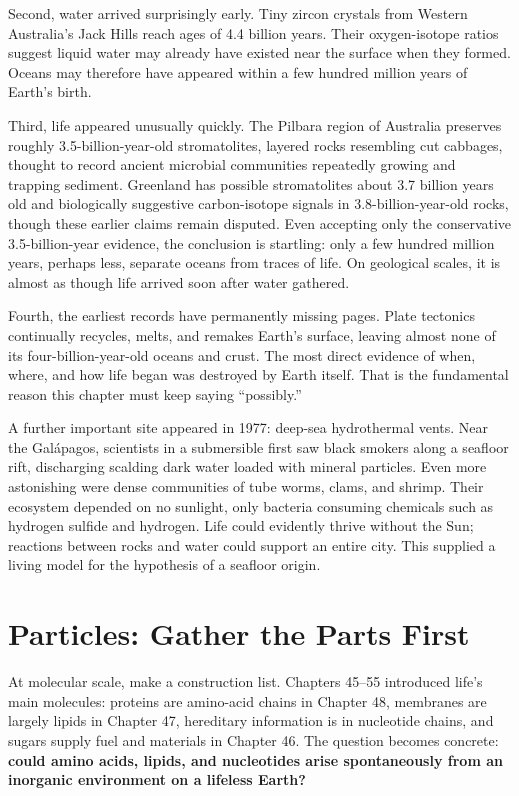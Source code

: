 Second, water arrived surprisingly early. Tiny zircon crystals from Western Australia's Jack Hills reach ages of 4.4 billion years. Their oxygen-isotope ratios suggest liquid water may already have existed near the surface when they formed. Oceans may therefore have appeared within a few hundred million years of Earth's birth.

Third, life appeared unusually quickly. The Pilbara region of Australia preserves roughly 3.5-billion-year-old stromatolites, layered rocks resembling cut cabbages, thought to record ancient microbial communities repeatedly growing and trapping sediment. Greenland has possible stromatolites about 3.7 billion years old and biologically suggestive carbon-isotope signals in 3.8-billion-year-old rocks, though these earlier claims remain disputed. Even accepting only the conservative 3.5-billion-year evidence, the conclusion is startling: only a few hundred million years, perhaps less, separate oceans from traces of life. On geological scales, it is almost as though life arrived soon after water gathered.

Fourth, the earliest records have permanently missing pages. Plate tectonics continually recycles, melts, and remakes Earth's surface, leaving almost none of its four-billion-year-old oceans and crust. The most direct evidence of when, where, and how life began was destroyed by Earth itself. That is the fundamental reason this chapter must keep saying ``possibly.''

A further important site appeared in 1977: deep-sea hydrothermal vents. Near the Galápagos, scientists in a submersible first saw black smokers along a seafloor rift, discharging scalding dark water loaded with mineral particles. Even more astonishing were dense communities of tube worms, clams, and shrimp. Their ecosystem depended on no sunlight, only bacteria consuming chemicals such as hydrogen sulfide and hydrogen. Life could evidently thrive without the Sun; reactions between rocks and water could support an entire city. This supplied a living model for the hypothesis of a seafloor origin.

\section{Particles: Gather the Parts First}

At molecular scale, make a construction list. Chapters 45--55 introduced life's main molecules: proteins are amino-acid chains in Chapter 48, membranes are largely lipids in Chapter 47, hereditary information is in nucleotide chains, and sugars supply fuel and materials in Chapter 46. The question becomes concrete: \textbf{could amino acids, lipids, and nucleotides arise spontaneously from an inorganic environment on a lifeless Earth?}

